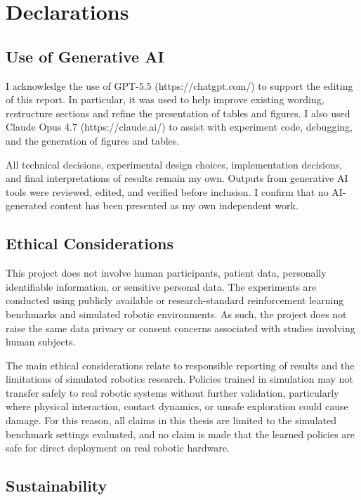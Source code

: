 
\chapter{Declarations}
\label{chap:declarations}

\section{Use of Generative AI}
\label{sec:decl-ai}

I acknowledge the use of GPT-5.5 (https://chatgpt.com/) to support the editing of this report. In particular, it was used to help improve existing wording, restructure sections and refine the presentation of tables and figures. I also used Claude Opus 4.7 (https://claude.ai/) to assist with experiment code, debugging, and the generation of figures and tables.

All technical decisions, experimental design choices, implementation decisions, and final interpretations of results remain my own. Outputs from generative AI tools were reviewed, edited, and verified before inclusion. I confirm that no AI-generated content has been presented as my own independent work.

\section{Ethical Considerations}
\label{sec:decl-ethics}

This project does not involve human participants, patient data, personally identifiable information, or sensitive personal data. The experiments are conducted using publicly available or research-standard reinforcement learning benchmarks and simulated robotic environments. As such, the project does not raise the same data privacy or consent concerns associated with studies involving human subjects.

The main ethical considerations relate to responsible reporting of results and the limitations of simulated robotics research. Policies trained in simulation may not transfer safely to real robotic systems without further validation, particularly where physical interaction, contact dynamics, or unsafe exploration could cause damage. For this reason, all claims in this thesis are limited to the simulated benchmark settings evaluated, and no claim is made that the learned policies are safe for direct deployment on real robotic hardware.

\section{Sustainability}
\label{sec:decl-sustainability}

